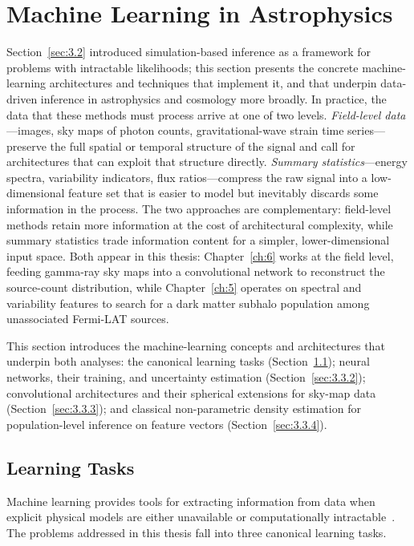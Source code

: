 \section{Machine Learning in Astrophysics}
\label{sec:3.3}
Section~\ref{sec:3.2} introduced simulation-based inference as a framework for problems with intractable likelihoods; this section presents the concrete machine-learning architectures and techniques that implement it, and that underpin data-driven inference in astrophysics and cosmology more broadly.
In practice, the data that these methods must process arrive at one of two levels.
\emph{Field-level data}---images, sky maps of photon counts, gravitational-wave strain time series---preserve the full spatial or temporal structure of the signal and call for architectures that can exploit that structure directly.
\emph{Summary statistics}---energy spectra, variability indicators, flux ratios---compress the raw signal into a low-dimensional feature set that is easier to model but inevitably discards some information in the process.
The two approaches are complementary: field-level methods retain more information at the cost of architectural complexity, while summary statistics trade information content for a simpler, lower-dimensional input space.
Both appear in this thesis: Chapter~\ref{ch:6} works at the field level, feeding gamma-ray sky maps into a convolutional network to reconstruct the source-count distribution, while Chapter~\ref{ch:5} operates on spectral and variability features to search for a dark matter subhalo population among unassociated Fermi-LAT sources.

This section introduces the machine-learning concepts and architectures that underpin both analyses: the canonical learning tasks (Section~\ref{sec:3.3.1}); neural networks, their training, and uncertainty estimation (Section~\ref{sec:3.3.2}); convolutional architectures and their spherical extensions for sky-map data (Section~\ref{sec:3.3.3}); and classical non-parametric density estimation for population-level inference on feature vectors (Section~\ref{sec:3.3.4}).

\subsection{Learning Tasks}
\label{sec:3.3.1}

Machine learning provides tools for extracting information from data when explicit physical models are either unavailable or computationally intractable~\cite{bishop,Hastie:2009}.
The problems addressed in this thesis fall into three canonical learning tasks.


